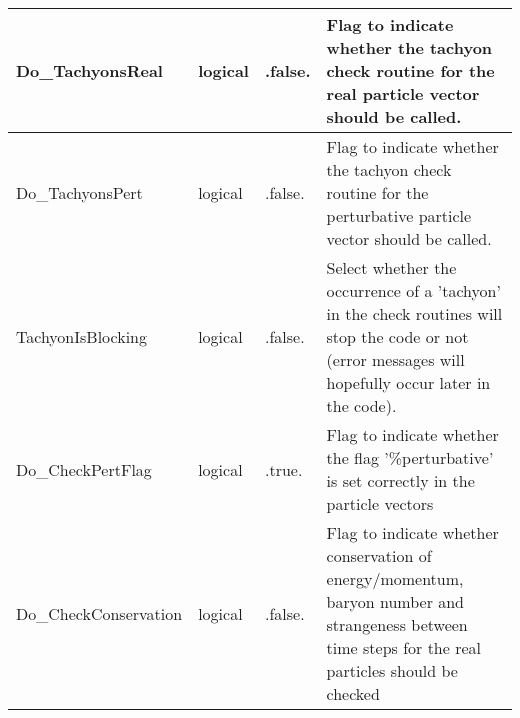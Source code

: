 \documentclass{article}
\begin{document}
\begin{longtable}{llll}
\midrule
Do\_TachyonsReal & \begin{minipage}[t]{2cm}logical\end{minipage} & \begin{minipage}[t]{2cm}.false.\end{minipage} & \begin{minipage}[t]{12cm}Flag to indicate whether the tachyon check routine for the real particle vector should be called.\end{minipage}\\*
\midrule
Do\_TachyonsPert & \begin{minipage}[t]{2cm}logical\end{minipage} & \begin{minipage}[t]{2cm}.false.\end{minipage} & \begin{minipage}[t]{12cm}Flag to indicate whether the tachyon check routine for the perturbative particle vector should be called.\end{minipage}\\*
\midrule
TachyonIsBlocking & \begin{minipage}[t]{2cm}logical\end{minipage} & \begin{minipage}[t]{2cm}.false.\end{minipage} & \begin{minipage}[t]{12cm}Select whether the occurrence of a 'tachyon' in the check routines will stop the code or not (error messages will hopefully occur later in the code).\end{minipage}\\*
\midrule
Do\_CheckPertFlag & \begin{minipage}[t]{2cm}logical\end{minipage} & \begin{minipage}[t]{2cm}.true.\end{minipage} & \begin{minipage}[t]{12cm}Flag to indicate whether the flag '\%perturbative' is set correctly in the particle vectors\end{minipage}\\*
\midrule
Do\_CheckConservation & \begin{minipage}[t]{2cm}logical\end{minipage} & \begin{minipage}[t]{2cm}.false.\end{minipage} & \begin{minipage}[t]{12cm}Flag to indicate whether conservation of energy/momentum, baryon number and strangeness between time steps for the real particles should be checked\end{minipage}\\*
\bottomrule
\end{longtable}
{ }
\end{document}
